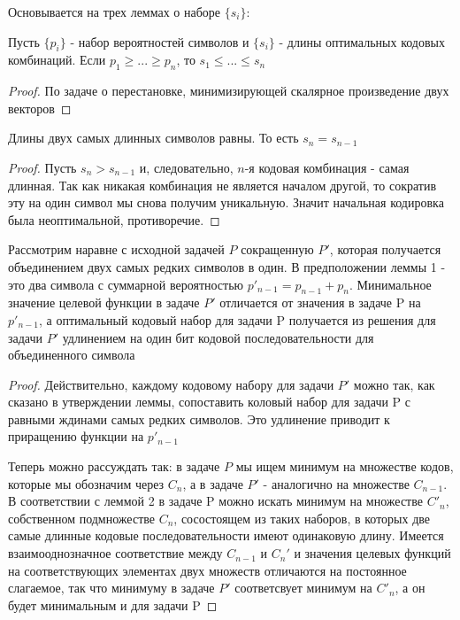 \documentclass[discrete.tex]{subfiles}
\begin{document}
  \begin{sol}
    Основывается на трех леммах о наборе $\{s_i\}$:
    \begin{lemma}[1]
      Пусть $\{p_i\}$ - набор вероятностей символов и $\{s_i\}$ - длины оптимальных кодовых комбинаций. Если $p_1 \geq ... \geq p_n$, то $s_1 \leq ... \leq s_n$
    \end{lemma}

    \begin{proof}
      По задаче о перестановке, минимизирующей скалярное произведение двух векторов
    \end{proof}

    \begin{lemma}[2]
      Длины двух самых длинных символов равны. То есть $s_n = s_{n-1}$
    \end{lemma}

    \begin{proof}
      Пусть $s_n > s_{n-1}$ и, следовательно, $n$-я кодовая комбинация - самая длинная. Так как никакая комбинация не является началом другой, то сократив эту на один символ мы снова получим уникальную. Значит начальная кодировка была неоптимальной, противоречие.
    \end{proof}

    \begin{lemma}[3]
      Рассмотрим наравне с исходной задачей $P$ сокращенную $P'$,  которая получается объединением двух самых редких символов в один. В предположении леммы 1 - это два символа с суммарной вероятностью $p'_{n-1} = p_{n-1} + p_n$. Минимальное значение целевой функции в задаче $P'$ отличается от значения в задаче P на $p'_{n-1}$, а оптимальный кодовый набор для задачи P получается из решения для задачи $P'$ удлинением на один бит кодовой последовательности для объединенного символа
    \end{lemma}

    \begin{proof}
      Действительно, каждому кодовому набору для задачи $P'$ можно так, как сказано в утверждении леммы, сопоставить коловый набор для задачи P с равными ждинами самых редких символов. Это удлинение приводит к приращению функции на $p'_{n-1}$

      Теперь можно рассуждать так: в задаче $P$ мы ищем минимум на множестве кодов, которые мы обозначим через $C_n$, а в задаче $P'$ - аналогично на множестве $C_{n-1}$. В соответствии с леммой 2 в задаче P можно искать минимум на множестве $C'_n$, собственном подмножестве $C_n$, сосостоящем из таких наборов, в которых две самые длинные кодовые последовательности имеют одинаковую длину. Имеется взаимооднозначное соответствие между $C_{n-1}$ и $C_n'$ и значения целевых функций на соответствующих элементах двух множеств отличаются на постоянное слагаемое, так что минимуму в задаче $P'$ соответсвует минимум на $C'_n$, а он будет минимальным и для задачи P
    \end{proof}


\end{sol}
\end{document}
